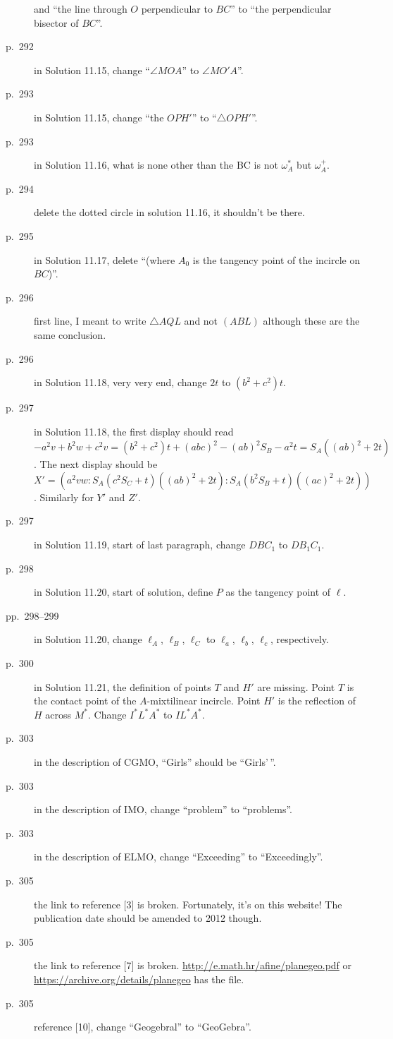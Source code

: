 \documentclass[11pt]{scrartcl}
\begin{document}
\begin{description}
  and ``the line through $O$ perpendicular to $BC$'' to ``the perpendicular bisector of $BC$''.
\item[p.\  292] in Solution 11.15, change ``$\angle MOA$'' to $\angle MO'A$''.
\item[p.\  293] in Solution 11.15, change ``the $OPH'$'' to ``$\triangle{OPH'}$''.
\item[p.\  293] in Solution 11.16, what is none other than the BC is not $\omega_A^\ast$ but $\omega_A^+$.
\item[p.\  294] delete the dotted circle in solution 11.16, it shouldn't be there.
\item[p.\  295] in Solution 11.17, delete ``(where $A_0$ is the tangency point of the incircle on $BC$)''.
\item[p.\  296] first line, I meant to write $\triangle{AQL}$ and not $(ABL)$
  although these are the same conclusion.
\item[p.\  296] in Solution 11.18, very very end, change $2t$ to $(b^2+c^2)t$.
\item[p.\  297] in Solution 11.18, the first display should read
  $-a^2v + b^2w + c^2v = (b^2+c^2)t + (abc)^2 - (ab)^2S_B - a^2t = S_A ((ab)^2 + 2t)$.
  The next display should be
  $X' = \left( a^2vw : S_A(c^2S_C+t)((ab)^2+2t) : S_A(b^2S_B+t)((ac)^2+2t) \right)$.
  Similarly for $Y'$ and $Z'$.
\item[p.\  297] in Solution 11.19, start of last paragraph, change $DBC_1$ to $DB_1C_1$.
\item[p.\  298] in Solution 11.20, start of solution, define $P$ as the tangency point of $\ell$.
\item[pp.\  298--299] in Solution 11.20, change $\ell_A$, $\ell_B$, $\ell_C$
  to $\ell_a$, $\ell_b$, $\ell_c$, respectively.
\item[p.\  300] in Solution 11.21, the definition of points $T$ and $H'$ are missing.
  Point $T$ is the contact point of the $A$-mixtilinear incircle.
  Point $H'$ is the reflection of $H$ across $M^\ast$.
  Change $I^\ast L^\ast A^\ast$ to $IL^\ast A^\ast$.
\item[p.\  303] in the description of CGMO, ``Girls'' should be ``Girls'\,''.
\item[p.\  303] in the description of IMO, change ``problem'' to ``problems''.
\item[p.\  303] in the description of ELMO, change ``Exceeding'' to ``Exceedingly''.
\item[p.\  305] the link to reference [3] is broken. Fortunately, it's on this website!
  The publication date should be amended to 2012 though.
\item[p.\  305] the link to reference [7] is broken. \url{http://e.math.hr/afine/planegeo.pdf}
  or \url{https://archive.org/details/planegeo} has the file.
\item[p.\  305] reference [10], change ``Geogebral'' to ``GeoGebra''.
\end{description}
\end{document}
